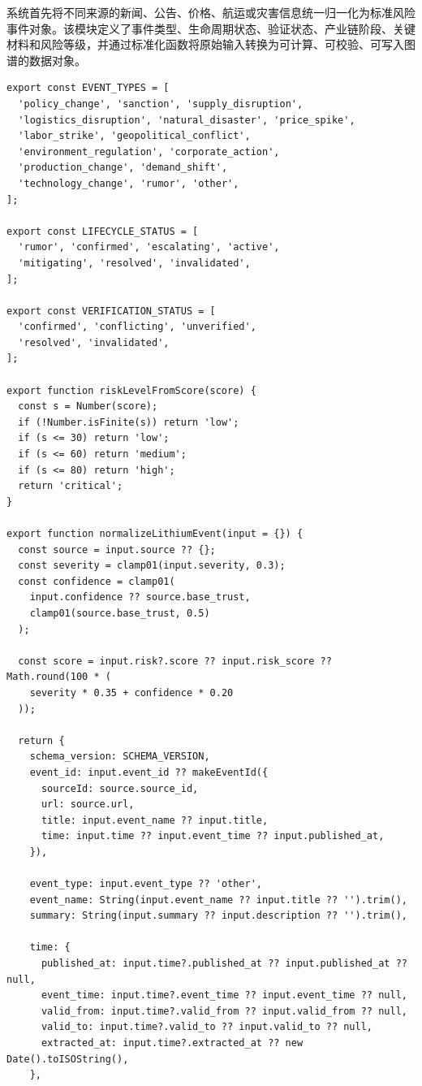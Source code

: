 ﻿\documentclass[12pt,a4paper]{article}
\begin{document}
系统首先将不同来源的新闻、公告、价格、航运或灾害信息统一归一化为标准风险事件对象。该模块定义了事件类型、生命周期状态、验证状态、产业链阶段、关键材料和风险等级，并通过标准化函数将原始输入转换为可计算、可校验、可写入图谱的数据对象。

\begin{lstlisting}[style=projectcode,caption={风险事件标准化与 Schema 校验核心实现}]
export const EVENT_TYPES = [
  'policy_change', 'sanction', 'supply_disruption',
  'logistics_disruption', 'natural_disaster', 'price_spike',
  'labor_strike', 'geopolitical_conflict',
  'environment_regulation', 'corporate_action',
  'production_change', 'demand_shift',
  'technology_change', 'rumor', 'other',
];

export const LIFECYCLE_STATUS = [
  'rumor', 'confirmed', 'escalating', 'active',
  'mitigating', 'resolved', 'invalidated',
];

export const VERIFICATION_STATUS = [
  'confirmed', 'conflicting', 'unverified',
  'resolved', 'invalidated',
];

export function riskLevelFromScore(score) {
  const s = Number(score);
  if (!Number.isFinite(s)) return 'low';
  if (s <= 30) return 'low';
  if (s <= 60) return 'medium';
  if (s <= 80) return 'high';
  return 'critical';
}

export function normalizeLithiumEvent(input = {}) {
  const source = input.source ?? {};
  const severity = clamp01(input.severity, 0.3);
  const confidence = clamp01(
    input.confidence ?? source.base_trust,
    clamp01(source.base_trust, 0.5)
  );

  const score = input.risk?.score ?? input.risk_score ?? Math.round(100 * (
    severity * 0.35 + confidence * 0.20
  ));

  return {
    schema_version: SCHEMA_VERSION,
    event_id: input.event_id ?? makeEventId({
      sourceId: source.source_id,
      url: source.url,
      title: input.event_name ?? input.title,
      time: input.time ?? input.event_time ?? input.published_at,
    }),

    event_type: input.event_type ?? 'other',
    event_name: String(input.event_name ?? input.title ?? '').trim(),
    summary: String(input.summary ?? input.description ?? '').trim(),

    time: {
      published_at: input.time?.published_at ?? input.published_at ?? null,
      event_time: input.time?.event_time ?? input.event_time ?? null,
      valid_from: input.time?.valid_from ?? input.valid_from ?? null,
      valid_to: input.time?.valid_to ?? input.valid_to ?? null,
      extracted_at: input.time?.extracted_at ?? new Date().toISOString(),
    },


\end{lstlisting}
\end{document}
